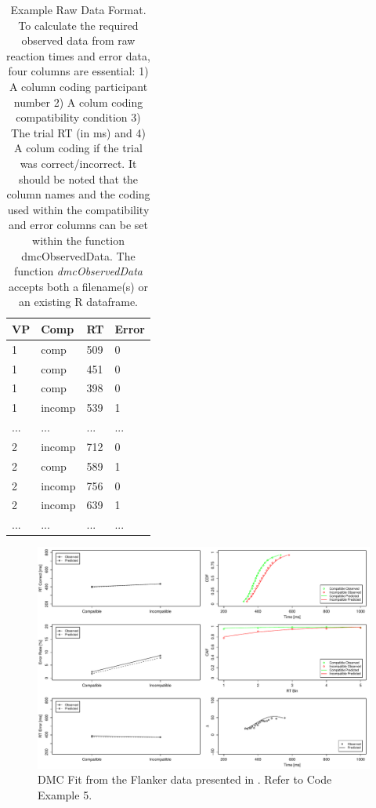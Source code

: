 \begin{table}
    \centering
    \caption{
        Example Raw Data Format. To calculate the required observed data from
        raw reaction times and error data, four columns are essential: 1) A
        column coding participant number 2) A colum coding compatibility
        condition 3) The trial RT (in ms) and 4) A colum coding if the trial
        was correct/incorrect. It should be noted that the column names and the
        coding used within the compatibility and error columns can be set
        within the function dmcObservedData. The function
        \textit{dmcObservedData} accepts both a filename(s) or an existing R
        dataframe. 
    }
    \begin{tabular}{llll}
        \hline
        VP&Comp&RT&Error\\ 
        \hline
        1&comp&509&0\\ 
        1&comp&451&0\\ 
        1&comp&398&0\\ 
        1&incomp&539&1\\ 
        ...&...&...&...\\ 
        2&incomp&712&0\\ 
        2&comp&589&1\\ 
        2&incomp&756&0\\ 
        2&incomp&639&1\\ 
        ...&...&...&...\\ 
    \end{tabular}
    \label{tab:dmc_raw_data}
\end{table}

\begin{figure}[H]
    \includegraphics[width=1\textwidth]{../figures/figure5.pdf}
    \caption{DMC Fit from the Flanker data presented in \textcite{ulrich2015automatic}. Refer to Code Example 5.}
    \label{fig:5}
\end{figure}

